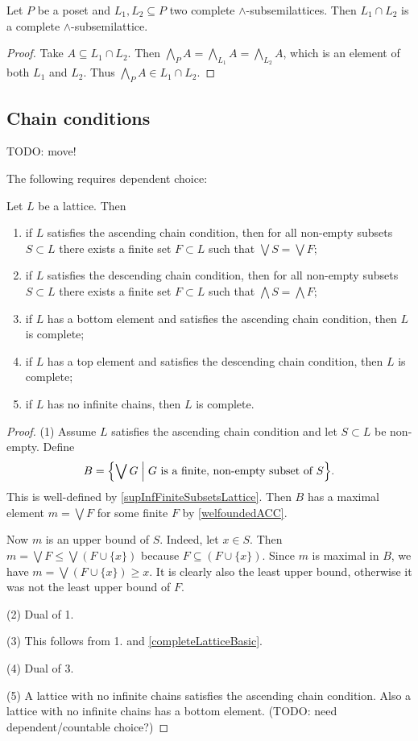 \begin{proposition} \label{intersectionCompleteSemilatticesCompleteSemilattice}
Let $P$ be a poset and $L_1, L_2 \subseteq P$ two complete $\wedge$-subsemilattices. Then $L_1\cap L_2$ is a complete $\wedge$-subsemilattice.
\end{proposition}
\begin{proof}
Take $A \subseteq L_1\cap L_2$. Then $\bigwedge_{P}A = \bigwedge_{L_1}A = \bigwedge_{L_2}A$, which is an element of both $L_1$ and $L_2$. Thus $\bigwedge_{P}A \in L_1\cap L_2$.
\end{proof}

\subsection{Chain conditions}
TODO: move!

The following requires dependent choice:
\begin{proposition} \label{ascendingDescendingChainLattice}
Let $L$ be a lattice. Then
\begin{enumerate}
\item if $L$ satisfies the ascending chain condition, then for all non-empty subsets $S\subset L$ there exists a finite set $F\subset L$ such that $\bigvee S = \bigvee F$;
\item if $L$ satisfies the descending chain condition, then for all non-empty subsets $S\subset L$ there exists a finite set $F\subset L$ such that $\bigwedge S = \bigwedge F$;
\item if $L$ has a bottom element and satisfies the ascending chain condition, then $L$ is complete;
\item if $L$ has a top element and satisfies the descending chain condition, then $L$ is complete;
\item if $L$ has no infinite chains, then $L$ is complete.
\end{enumerate}
\end{proposition}
\begin{proof}
(1) Assume $L$ satisfies the ascending chain condition and let $S\subset L$ be non-empty. Define
\[ B = \setbuilder{\bigvee G}{\text{$G$ is a finite, non-empty subset of $S$}}. \]
This is well-defined by \ref{supInfFiniteSubsetsLattice}. Then $B$ has a maximal element $m = \bigvee F$ for some finite $F$ by \ref{welfoundedACC}.

Now $m$ is an upper bound of $S$. Indeed, let $x\in S$. Then $m= \bigvee F \leq \bigvee (F\cup\{x\})$ because $F\subseteq (F\cup \{x\})$. Since $m$ is maximal in $B$, we have $m = \bigvee (F\cup\{x\}) \geq x$. It is clearly also the least upper bound, otherwise it was not the least upper bound of $F$.

(2) Dual of 1.

(3) This follows from 1. and \ref{completeLatticeBasic}.

(4) Dual of 3.

(5) A lattice with no infinite chains satisfies the ascending chain condition. Also a lattice
with no infinite chains has a bottom element. (TODO: need dependent/countable choice?)
\end{proof}

